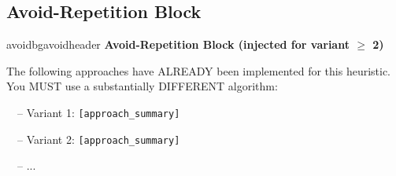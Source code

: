 \documentclass[11pt]{article}
\newcommand{\pgreen}[1]{{\color{promptgreen}\texttt{#1}}}
\begin{document}
\subsection{Avoid-Repetition Block}\label{app:avoid}

\begin{promptbox}{avoidbg}{avoidheader}
\textbf{Avoid-Repetition Block (injected for variant $\geq$ 2)}

\medskip
The following approaches have ALREADY been implemented for this heuristic. You MUST use a substantially DIFFERENT algorithm:

~~-- Variant 1: \pgreen{[approach\_summary]}

~~-- Variant 2: \pgreen{[approach\_summary]}

~~-- ...
\end{promptbox}
\end{document}
